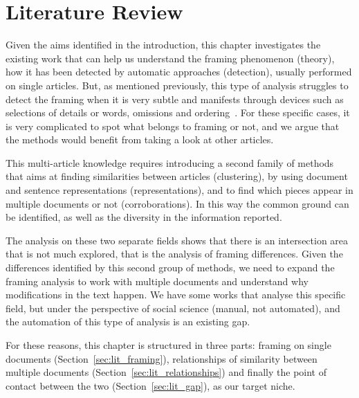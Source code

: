 \chapter{Literature Review}
\label{chap:literature_review}



Given the aims identified in the introduction, this chapter investigates the existing work that can help us understand the framing phenomenon (theory), how it has been detected by automatic approaches (detection), usually performed on single articles.
But, as mentioned previously, this type of analysis struggles to detect the framing when it is very subtle and manifests through devices such as selections of details or words, omissions and ordering~\cite{morstatter2018identifying}.
For these specific cases, it is very complicated to spot what belongs to framing or not, and we argue that the methods would benefit from taking a look at other articles.

This multi-article knowledge requires introducing a second family of methods that aims at finding similarities between articles (clustering), by using document and sentence representations (representations), and to find which pieces appear in multiple documents or not (corroborations). In this way the common ground can be identified, as well as the diversity in the information reported.

The analysis on these two separate fields shows that there is an intersection area that is not much explored, that is the analysis of framing differences. Given the differences identified by this second group of methods, we need to expand the framing analysis to work with multiple documents and understand why modifications in the text happen.
We have some works that analyse this specific field, but under the perspective of social science (manual, not automated), and the automation of this type of analysis is an existing gap.


For these reasons, this chapter is structured in three parts: framing on single documents (Section~\ref{sec:lit_framing}), relationships of similarity between multiple documents (Section~\ref{sec:lit_relationships}) and finally the point of contact between the two (Section~\ref{sec:lit_gap}), as our target niche.

